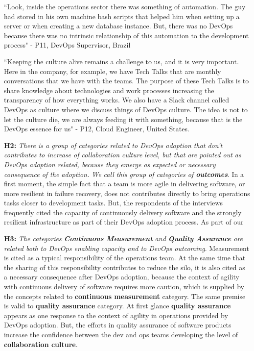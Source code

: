 ``Look, inside the operations sector there was something of automation. The guy
had stored in his own machine bash scripts that helped him when setting up a
server or when creating a new database instance. But, there was no DevOps
because there was no intrinsic relationship of this automation to the
development process" - P11, DevOps Supervisor, Brazil

``Keeping the culture alive remains a challenge to us, and it is very
important. Here in the company, for example, we have Tech Talks that are
monthly conversations that we have with the teams. The purpose of these Tech
Talks is to share knowledge about technologies and work processes increasing the
transparency of how everything works. We also have a Slack channel called
DevOps as culture where we discuss things of DevOps culture. The idea is not to
let the culture die, we are always feeding it with something, because that is
the DevOps essence for us" - P12, Cloud Engineer, United States.

\textbf{H2:} \textit{There is a group of categories related to DevOps adoption
that don't contributes to increase of collaboration culture level, but that are
pointed out as DevOps adoption related, because they emerge as expected or
necessary consequence of the adoption. We call this group of categories of
\textbf{outcomes}}. In a first moment, the simple fact that a team is more
agile in delivering software, or more resilient in failure recovery, does not
contributes directly to bring operations tasks closer to development tasks.
But, the respondents of the interviews frequently cited the capacity of
continuously delivery software and the strongly resilient infrastructure as
part of their DevOps adoption process. As part of our

\textbf{H3:} \textit{The categories \textbf{Continuous Measurement} and \textbf{Quality Assurance} are related both to DevOps enabling capacity and to DevOps outcoming}. Measurement is cited as a typical responsibility of the operations team. At the same time that the sharing of this responsibility contributes to reduce the silo, it is also cited as a necessary consequence after DevOps adoption, because the context of agility with continuous delivery of software requires more caution, which is supplied by the concepts related to \textbf{continuous measurement} category. The same premise is valid to \textbf{quality assurance} category. At first glance \textbf{quality assurance} appears as one response to the context of agility in operations provided by DevOps adoption. But, the efforts in quality assurance of software products increase the confidence between the dev and ops teams developing the level of \textbf{collaboration culture}.

